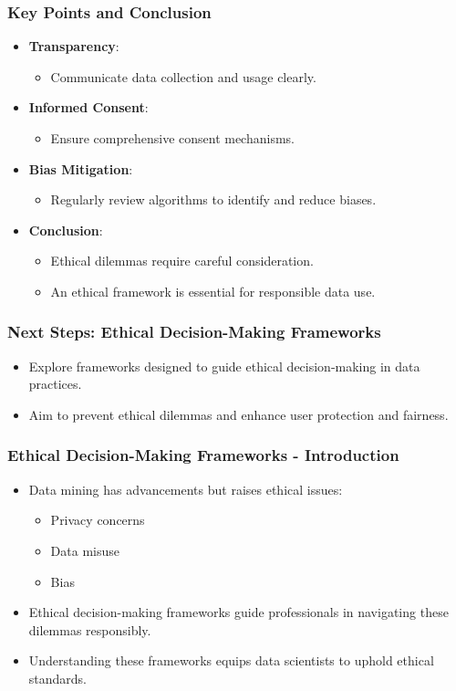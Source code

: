 \documentclass[aspectratio=169]{beamer}
\begin{document}
\begin{frame}[fragile]
    \frametitle{Key Points and Conclusion}
    \begin{itemize}
        \item \textbf{Transparency}:
        \begin{itemize}
            \item Communicate data collection and usage clearly.
        \end{itemize}
        \item \textbf{Informed Consent}:
        \begin{itemize}
            \item Ensure comprehensive consent mechanisms.
        \end{itemize}
        \item \textbf{Bias Mitigation}:
        \begin{itemize}
            \item Regularly review algorithms to identify and reduce biases.
        \end{itemize}
        \item \textbf{Conclusion}: 
        \begin{itemize}
            \item Ethical dilemmas require careful consideration. 
            \item An ethical framework is essential for responsible data use.
        \end{itemize}
    \end{itemize}
\end{frame}

\begin{frame}[fragile]
    \frametitle{Next Steps: Ethical Decision-Making Frameworks}
    \begin{itemize}
        \item Explore frameworks designed to guide ethical decision-making in data practices.
        \item Aim to prevent ethical dilemmas and enhance user protection and fairness.
    \end{itemize}
\end{frame}

\begin{frame}[fragile]
    \frametitle{Ethical Decision-Making Frameworks - Introduction}
    \begin{itemize}
        \item Data mining has advancements but raises ethical issues:
        \begin{itemize}
            \item Privacy concerns
            \item Data misuse
            \item Bias
        \end{itemize}
        \item Ethical decision-making frameworks guide professionals in navigating these dilemmas responsibly.
        \item Understanding these frameworks equips data scientists to uphold ethical standards.
    \end{itemize}
\end{frame}
\end{document}
